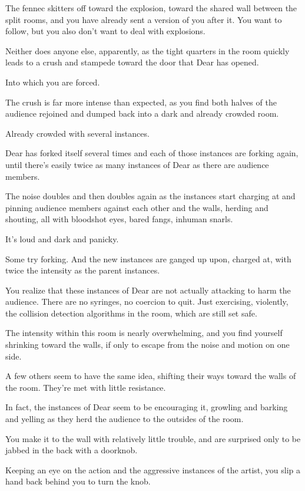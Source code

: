 The fennec skitters off toward the explosion, toward the shared wall between the split rooms, and you have already sent a version of you after it. You want to follow, but you also don't want to deal with explosions.

Neither does anyone else, apparently, as the tight quarters in the room quickly leads to a crush and stampede toward the door that Dear has opened.

Into which you are forced.

The crush is far more intense than expected, as you find both halves of the audience rejoined and dumped back into a dark and already crowded room.

Already crowded with several instances.

Dear has forked itself several times and each of those instances are forking again, until there's easily twice as many instances of Dear as there are audience members.

The noise doubles and then doubles again as the instances start charging at and pinning audience members against each other and the walls, herding and shouting, all with bloodshot eyes, bared fangs, inhuman snarls.

It's loud and dark and panicky.

Some try forking. And the new instances are ganged up upon, charged at, with twice the intensity as the parent instances.

You realize that these instances of Dear are not actually attacking to harm the audience. There are no syringes, no coercion to quit. Just exercising, violently, the collision detection algorithms in the room, which are still set safe.

The intensity within this room is nearly overwhelming, and you find yourself shrinking toward the walls, if only to escape from the noise and motion on one side.

A few others seem to have the same idea, shifting their ways toward the walls of the room. They're met with little resistance.

In fact, the instances of Dear seem to be encouraging it, growling and barking and yelling as they herd the audience to the outsides of the room.

You make it to the wall with relatively little trouble, and are surprised only to be jabbed in the back with a doorknob.

Keeping an eye on the action and the aggressive instances of the artist, you slip a hand back behind you to turn the knob.

